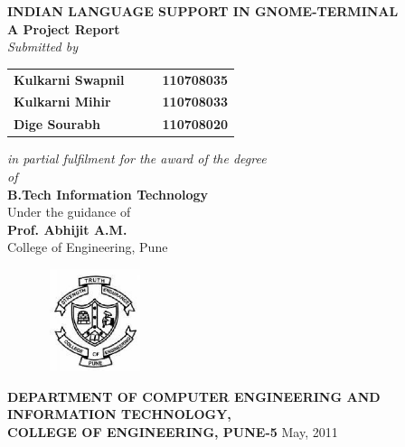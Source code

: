 \begin{titlepage}
\begin{center}
\LARGE{\bf{INDIAN LANGUAGE SUPPORT IN GNOME-TERMINAL\\}}	%
\vspace{10pt}
\Large{\bf{A Project Report\\}}		%
\Large{\em{Submitted by\\}}
\begin{table}[htbp]
	\begin{center}
	\begin{tabular}{ l c c l }
	\Large\bf{Kulkarni Swapnil} & & & \Large\bf{110708035} \\[0.3cm] 
	\Large\bf{Kulkarni Mihir} & & & \Large\bf{110708033} \\[0.3cm]
	\Large\bf{Dige Sourabh} & & & \Large\bf{110708020} \\[0.3cm] 	
	\end{tabular}
	\end{center}
	\end{table}
\Large{\em{in partial fulfilment for the award of the degree\\ \vspace{1.5pt}of\\}}
\LARGE{\bf{B.Tech Information Technology\\}}%
\vspace{20pt}
\Large{Under the guidance of\\ }
\Large{\bf{Prof. Abhijit A.M.}\\}
\Large{College of Engineering, Pune\\}
\vspace{10pt}
\begin{figure}[h]
\centering
\includegraphics[width=3cm,height=3cm]{coeplogo.eps}
\end{figure}
\Large{\bf{DEPARTMENT OF COMPUTER ENGINEERING AND \\INFORMATION TECHNOLOGY,\\ 
COLLEGE OF ENGINEERING, PUNE-5}}
\vfill
\large{May, 2011}
\end{center}
\end{titlepage}
